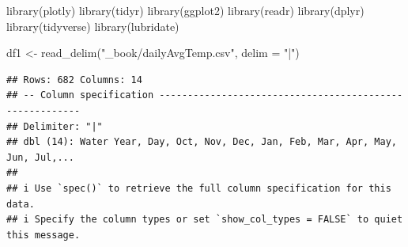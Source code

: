 \documentclass[
]{book}
\newenvironment{Shaded}{\begin{snugshade}}{\end{snugshade}}
\newcommand{\AttributeTok}[1]{\textcolor[rgb]{0.77,0.63,0.00}{#1}}
\newcommand{\FunctionTok}[1]{\textcolor[rgb]{0.00,0.00,0.00}{#1}}
\newcommand{\NormalTok}[1]{#1}
\newcommand{\OtherTok}[1]{\textcolor[rgb]{0.56,0.35,0.01}{#1}}
\newcommand{\StringTok}[1]{\textcolor[rgb]{0.31,0.60,0.02}{#1}}
\theoremstyle{definition}
\theoremstyle{definition}
\theoremstyle{definition}
\theoremstyle{definition}
\theoremstyle{remark}
\begin{document}
\begin{Shaded}
\begin{Highlighting}[]
\FunctionTok{library}\NormalTok{(plotly)}
\FunctionTok{library}\NormalTok{(tidyr)}
\FunctionTok{library}\NormalTok{(ggplot2)}
\FunctionTok{library}\NormalTok{(readr)}
\FunctionTok{library}\NormalTok{(dplyr)}
\FunctionTok{library}\NormalTok{(tidyverse)}
\FunctionTok{library}\NormalTok{(lubridate)}

\NormalTok{df1 }\OtherTok{\textless{}{-}} \FunctionTok{read\_delim}\NormalTok{(}\StringTok{"\_book/dailyAvgTemp.csv"}\NormalTok{, }\AttributeTok{delim =} \StringTok{"|"}\NormalTok{)}
\end{Highlighting}
\end{Shaded}

\begin{verbatim}
## Rows: 682 Columns: 14
## -- Column specification --------------------------------------------------------
## Delimiter: "|"
## dbl (14): Water Year, Day, Oct, Nov, Dec, Jan, Feb, Mar, Apr, May, Jun, Jul,...
## 
## i Use `spec()` to retrieve the full column specification for this data.
## i Specify the column types or set `show_col_types = FALSE` to quiet this message.
\end{verbatim}
\end{document}

